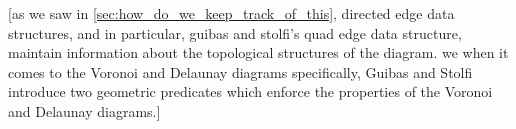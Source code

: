 \documentclass[12pt,twoside]{reedthesis}
\begin{document}
    [as we saw in \cref{sec:how_do_we_keep_track_of_this}, directed edge data structures, and in particular, guibas and stolfi's quad edge data structure, maintain information about the topological structures of the diagram. we when it comes to the Voronoi and Delaunay diagrams specifically, Guibas and Stolfi introduce two geometric predicates which enforce the  properties of the Voronoi and Delaunay diagrams.]


  


\end{document}
